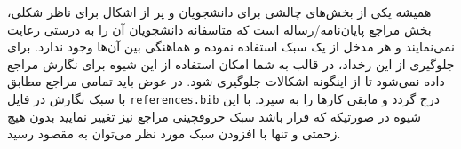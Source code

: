      همیشه یکی از بخش‌های چالشی برای دانشجویان و پر از اشکال برای ناظر شکلی، بخش مراجع پایان‌نامه/رساله است که متاسفانه دانشجویان آن را به 
     درستی رعایت نمی‌نمایند و هر مدخل از یک سبک استفاده نموده و هماهنگی بین آن‌ها وجود ندارد. برای جلوگیری از این  رخداد، 
     در قالب  به شما امکان استفاده از این شیوه برای نگارش مراجع داده نمی‌شود تا از اینگونه اشکالات جلوگیری شود. 
     در عوض باید تمامی مراجع مطابق با سبک نگارش   در فایل \Verb+references.bib+ درج گردد و مابقی کارها را به  سپرد. 
     با این شیوه در صورتیکه که قرار باشد سبک حروفچینی مراجع نیز تغییر نمایید بدون هیچ زحمتی و تنها با افزودن سبک مورد نظر می‌توان به مقصود رسید. 
     
